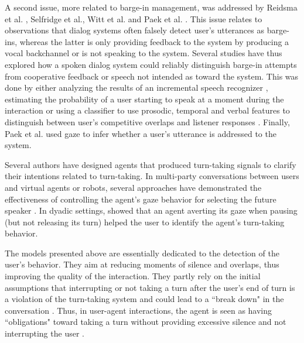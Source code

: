 \documentclass[twocolumn]{svjour3}
\begin{document}
A second issue, more related to barge-in management,
was addressed by Reidsma et al. \citep{reidsma_continuous_2011}, Selfridge et al.\citep{selfridge_continuously_2013}, Witt et al.\citep{witt_modeling_2014} and Paek et al. \citep{paek_continuous_2000}. This issue relates to observations that dialog systems often falsely detect user's utterances as barge-ins, whereas the latter is only providing feedback to the system by producing a vocal backchannel or is not speaking to the system. Several studies have thus explored how a spoken dialog system could reliably distinguish barge-in
attempts from cooperative feedback or speech not intended as toward the system. This was done by either analyzing the results of an incremental speech recognizer \citep{selfridge_continuously_2013}, estimating the probability of a user starting to speak at a moment during the interaction \citep{witt_modeling_2014} or using a classifier to use prosodic, temporal and verbal features to distinguish between user's competitive overlaps and listener responses \citep{reidsma_continuous_2011}. Finally, Paek et al. \citep{paek_continuous_2000} used gaze to infer whether a user's utterance is addressed to the system. 

Several authors have designed agents that produced turn-taking signals to clarify their intentions related to turn-taking. In multi-party conversations between users and virtual agents or robots, several approaches have demonstrated the effectiveness of controlling the agent's gaze behavior for selecting the future speaker \citep{mutlu_storytelling_2006,bohus_facilitating_2010,al_moubayed_regulating_2015}. In dyadic settings, \citep{skantze_turn-taking_2014} showed that an agent averting its gaze when pausing (but not releasing its turn) helped the user to identify the agent's turn-taking behavior.

The models presented above are essentially dedicated to the detection of the user's behavior. They aim at reducing moments of silence and overlaps, thus improving the quality of the interaction. 
They partly rely on the initial assumptions that interrupting or not taking a turn after the user's end of turn is a violation of the turn-taking system and could lead to a ``break down" in the conversation \citep{cutler_analysis_1986}. 
Thus, in user-agent interactions,  the agent is seen as having ``obligations" toward
taking a turn without providing excessive silence and not interrupting the user \citep{de_kok_multimodal_2009}.
\end{document}
